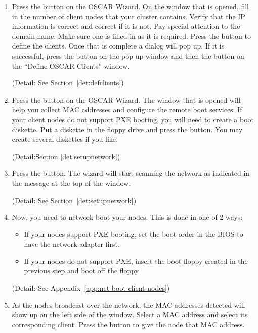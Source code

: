 \begin {enumerate}
  (Detail: See Section~\ref{det:buildimage})
  
\item Press the  button on the OSCAR
  Wizard.  On the window that is opened, fill in the number of client
  nodes that your cluster contains. Verify that the IP information is
  correct and correct if it is not.  Pay special attention to the
  domain name. Make sure one is filled in as it is required.  Press
  the  button to define the clients. Once that is
  complete a dialog will pop up.  If it is successful, press the
   button on the pop up window and then the
   button on the ``Define OSCAR Clients'' window.

  (Detail: See Section~\ref{det:defclients})

\item Press the  button on the OSCAR Wizard.
  The window that is opened will help you collect MAC addresses and
  configure the remote boot services. If your client nodes do not
  support PXE booting, you will need to create a boot diskette. Put a
  diskette in the floppy drive and press the  button. You may create several diskettes if you like.

  (Detail:Section \ref{det:setupnetwork})

\item Press the  button. The wizard will
  start scanning the network as indicated in the message at the top of
  the window.

  (Detail: See Section~\ref{det:setupnetwork})

\item Now, you need to network boot your nodes. This is done in one of
  2 ways:

  \begin{itemize}
  \item If your nodes support PXE booting, set the boot order in the
    BIOS to have the network adapter first.
  \item If your nodes do not support PXE, insert the boot floppy
    created in the previous step and boot off the floppy
  \end{itemize}
        
  (Detail: See Appendix~\ref{app:net-boot-client-nodes})

\item As the nodes broadcast over the network, the MAC addresses
  detected will show up on the left side of the window. Select a MAC
  address and select its corresponding client. Press the
   button to give the node that MAC
  address.


\end{enumerate}
